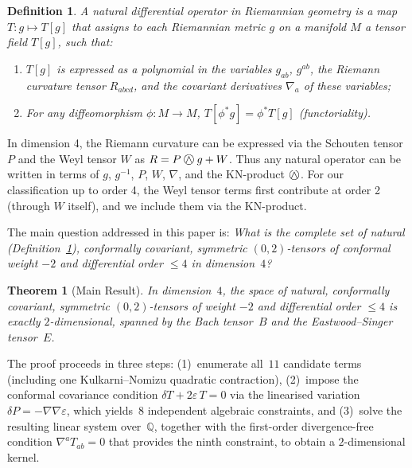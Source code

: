 \documentclass[11pt,a4paper]{article}
\newcommand{\owedge}{\mathbin{%
  \text{%
    \ooalign{%
      \hfil$\wedge$\hfil\cr
      \hfil\raisebox{0.05em}{$\bigcirc$}\hfil\cr
    }%
  }%
}}
\newtheorem{definition}[theorem]{Definition}
\newtheorem*{theorem*}{Theorem}
\begin{document}
\begin{definition}
\label{def:natural}
A \emph{natural differential operator} in Riemannian geometry is a map
$T: g \mapsto T[g]$ that assigns to each Riemannian metric $g$ on a
manifold $M$ a tensor field $T[g]$, such that:
\begin{enumerate}[label=(\roman*)]
  \item $T[g]$ is expressed as a polynomial in the variables
    $g_{ab}$, $g^{ab}$, the Riemann curvature tensor $R_{abcd}$,
    and the covariant derivatives $\nabla_a$ of these variables;
  \item For any diffeomorphism $\phi: M \to M$,
    $T[\phi^* g] = \phi^* T[g]$ (functoriality).
\end{enumerate}
\end{definition}

In dimension 4, the Riemann curvature can be expressed via the Schouten
tensor $P$ and the Weyl tensor $W$ as $R = P \owedge g + W$.
Thus any natural operator can be written in terms of $g$, $g^{-1}$, $P$,
$W$, $\nabla$, and the KN-product $\owedge$. For our classification
up to order 4, the Weyl tensor terms first contribute at order 2
(through $W$ itself), and we include them via the KN-product.

The main question addressed in this paper is: \emph{What is the complete
set of natural (Definition~\ref{def:natural}), conformally covariant,
symmetric $(0,2)$-tensors
of conformal weight $-2$ and differential order $\le 4$ in dimension~$4$?}

\begin{theorem*}[Main Result]
In dimension~$4$, the space of natural, conformally covariant, symmetric
$(0,2)$-tensors of weight $-2$ and differential order $\le 4$
is exactly $2$-dimensional, spanned by the Bach tensor~$B$ and the
Eastwood--Singer tensor~$E$.
\end{theorem*}

The proof proceeds in three steps:
(1)~enumerate all~$11$ candidate terms (including one
Kulkarni--Nomizu quadratic contraction),
(2)~impose the conformal covariance condition
$\delta T + 2\varepsilon\, T = 0$
via the linearised variation
$\delta P = -\nabla\nabla\varepsilon$,
which yields~$8$ independent algebraic constraints, and
(3)~solve the resulting linear system over~$\mathbb{Q}$, together with the
first-order divergence-free condition $\nabla^a T_{ab} = 0$ that provides
the ninth constraint, to obtain a $2$-dimensional kernel.

\end{document}
